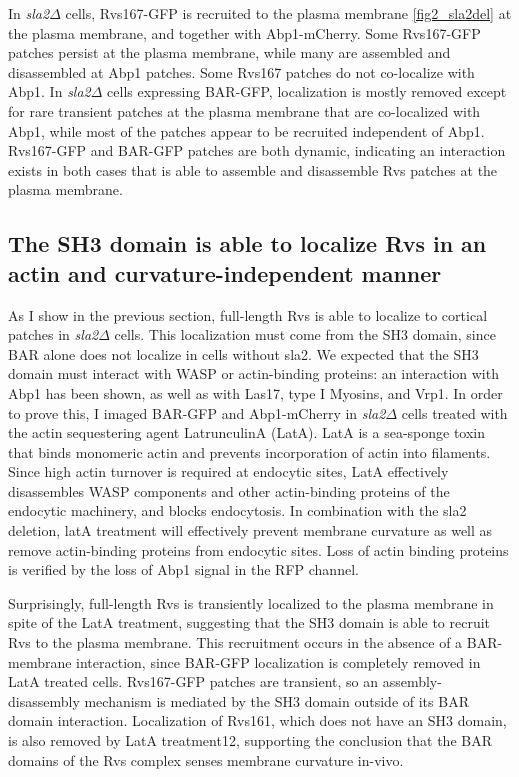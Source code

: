 	\vspace{5mm}
	In \textit{sla2$\Delta$} cells, Rvs167-GFP is recruited to the plasma membrane \ref{fig2_sla2del} at the plasma membrane, and together with Abp1-mCherry. Some Rvs167-GFP patches persist at the plasma membrane, while many are assembled and disassembled at Abp1 patches. Some Rvs167 patches do not co-localize with Abp1. In \textit{sla2$\Delta$} cells expressing BAR-GFP, localization is mostly removed except for rare transient patches at the plasma membrane that are co-localized with Abp1, while most of the patches appear to be recruited independent of Abp1. Rvs167-GFP and BAR-GFP patches are both dynamic, indicating an interaction exists in both cases that is able to assemble and disassemble Rvs patches at the plasma membrane. 

	\subsection{The SH3 domain is able to localize Rvs in an actin and curvature-independent manner}

	As I show in the previous section, full-length Rvs is able to localize to cortical patches in \textit{sla2$\Delta$} cells. This localization must come from the SH3 domain, since BAR alone does not localize in cells without sla2. We expected that the SH3 domain must interact with WASP or actin-binding proteins: an interaction with Abp1 has been shown, as well as with Las17, type I Myosins, and Vrp1. In order to prove this, I imaged BAR-GFP and Abp1-mCherry in \textit{sla2$\Delta$} cells treated with the actin sequestering agent LatrunculinA (LatA). LatA is a sea-sponge toxin that binds monomeric actin and prevents incorporation of actin into filaments. Since high actin turnover is required at endocytic sites, LatA effectively disassembles WASP components and other actin-binding proteins of the endocytic machinery, and blocks endocytosis. In combination with the sla2 deletion, latA treatment will effectively prevent membrane curvature as well as remove actin-binding proteins from endocytic sites. Loss of actin binding proteins is verified by the loss of Abp1 signal in the RFP channel.


	\vspace{5mm}
Surprisingly, full-length Rvs is transiently localized to the plasma membrane in spite of the LatA treatment, suggesting that the SH3 domain is able to recruit Rvs to the plasma membrane. This recruitment occurs in the absence of a BAR-membrane interaction, since BAR-GFP localization is completely removed in LatA treated cells. Rvs167-GFP patches are transient, so an assembly-disassembly mechanism is mediated by the SH3 domain outside of its BAR domain interaction. Localization of Rvs161, which does not have an SH3 domain, is also removed by LatA treatment12, supporting the conclusion that the BAR domains of the Rvs complex senses membrane curvature in-vivo. 

